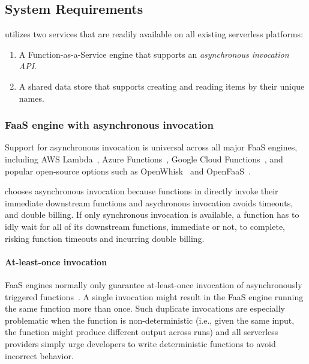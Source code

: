 \subsection{System Requirements}\label{sec:design-req}

\name{} utilizes two services that are readily available on all existing
serverless platforms:

\begin{enumerate}

	\item A Function-as-a-Service engine that supports an
	\emph{asynchronous invocation API}.

	\item A shared data store that supports creating and reading items by
	 their unique names.

\end{enumerate}

\subsubsection{FaaS engine with asynchronous invocation}

Support for asynchronous invocation is universal across all major FaaS
engines, including AWS Lambda~\cite{aws-lambda-async-invoke}, Azure
Functions~\cite{azure-functions-async-invoke}, Google Cloud
Functions~\cite{google-cloud-functions-async-invoke}, and popular open-source
options such as OpenWhisk~\cite{openwhisk-async-invoke} and
OpenFaaS~\cite{openfaas-async-invoke}.

\name{} chooses asynchronous invocation because functions in \name{} directly invoke
their immediate downstream functions and asychronous invocation avoids
timeouts, and double billing. If only synchronous invocation is available, a
function has to idly wait for all of its downstream functions, immediate or
not, to complete, risking function timeouts and incurring double billing.

\paragraph{At-least-once invocation}

FaaS engines normally only guarantee at-least-once invocation of
asynchronously triggered
functions~\cite{google-cloud-functions-exec-guarantee,
aws-lambda-async-invoke, azure-functions-exec-guarantee}. A single invocation
might result in the FaaS engine running the same function more than once. Such
duplicate invocations are especially problematic when the function is
non-deterministic (i.e., given the same input, the function might produce
different output across runs) and all serverless providers simply urge
developers to write deterministic functions to avoid incorrect behavior.

